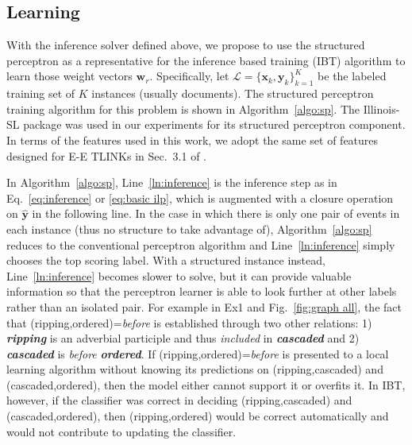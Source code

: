 \documentclass[11pt,letterpaper]{article}
\newcommand\mbf[1]{\mathbf{#1}}
\newcommand{\event}[1]{\textit{\textbf{#1}}}
\newcommand{\rel}[1]{\textit{#1}}
\newcommand{\final}[1]{#1}
\begin{document}
	
\subsection{Learning}
With the inference solver defined above, we propose to use the structured perceptron \citep{collins2002} as a representative for the inference based training (IBT) algorithm to learn those weight vectors $\mbf w_r$.
Specifically, let $\mathcal{L}=\{\mathbf{x}_k,\mathbf{y}_k\}_{k=1}^K$ be the labeled training set of $K$ instances (usually documents). The structured perceptron training algorithm for this problem is shown in Algorithm~\ref{algo:sp}. The Illinois-SL package \citep{CSGR10} was used in our experiments for its structured perceptron component.
\final{In terms of the features used in this work, we adopt the same set of features designed for E-E TLINKs in Sec.~3.1 of \citet{DoLuRo12}.}
 
In Algorithm~\ref{algo:sp}, Line~\ref{ln:inference} is the inference step as in Eq.~\eqref{eq:inference} or \eqref{eq:basic ilp}, which is augmented with a closure operation on $\hat{\mathbf{y}}$ in the following line.
In the case in which there is only one pair of events in each instance (thus no structure to take advantage of),  Algorithm~\ref{algo:sp} reduces to the conventional perceptron algorithm and Line~\ref{ln:inference} simply chooses the top scoring label.
With a structured instance instead, Line~\ref{ln:inference} becomes slower to solve, but it can provide valuable information so that the perceptron learner is able to look further at other labels rather than an isolated pair. 
For example in Ex1 and Fig.~\ref{fig:graph all}, the fact that ({ripping},{ordered})=\rel{before}  is established through two other relations: 1) \event{ripping} is an adverbial participle and thus \rel{included} in \event{cascaded} and 2) \event{cascaded} is \rel{before} \event{ordered}. If ({ripping},{ordered})=\rel{before} is presented to a local learning algorithm without knowing its predictions on ({ripping},{cascaded}) and ({cascaded},{ordered}), then the model either cannot support it or overfits it. 
In IBT, however, if the classifier was correct in deciding ({ripping},{cascaded}) and ({cascaded},{ordered}), then ({ripping},{ordered}) would be correct automatically and would not contribute to updating the classifier. 
\end{document}
